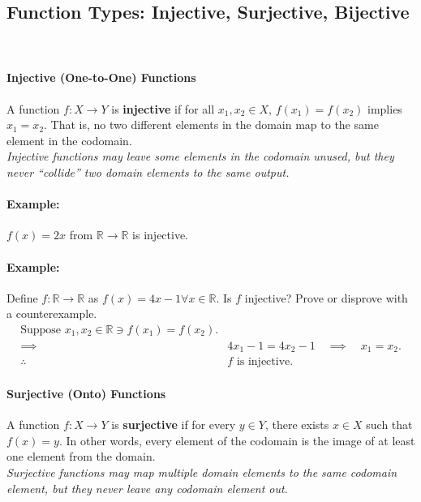 \subsection*{Function Types: Injective, Surjective, Bijective}
\hrulefill\\

\paragraph*{Injective (One-to-One) Functions}
A function $f: X \to Y$ is \textbf{injective} if for all $x_1, x_2 \in X$, $f(x_1) = f(x_2)$ implies $x_1 = x_2$. That is, no two different elements in the domain map to the same element in the codomain. \\
\textit{Injective functions may leave some elements in the codomain unused, but they never ``collide'' two domain elements to the same output.}

\paragraph*{Example:} $f(x) = 2x$ from $\mathbb{R} \to \mathbb{R}$ is injective.

\paragraph*{Example:} Define $f: \mathbb{R} \to \mathbb{R}$ as $f(x) = 4x - 1 \forall x \in \mathbb{R}$. 
Is $f$ injective? Prove or disprove with a counterexample.\\
\begin{align*}
    \text{Suppose } x_1, x_2 \in \mathbb{R} \ni f(x_1) = f(x_2).\\
    \implies \quad & 4x_1 - 1 = 4x_2 - 1 \quad \implies \quad x_1 = x_2.\\
    \therefore \quad & f \text{ is injective.}
\end{align*}

\paragraph*{Surjective (Onto) Functions}
A function $f: X \to Y$ is \textbf{surjective} if for every $y \in Y$, there exists $x \in X$ such that $f(x) = y$. In other words, every element of the codomain is the image of at least one element from the domain.\\
\textit{Surjective functions may map multiple domain elements to the same codomain element, but they never leave any codomain element out.}

